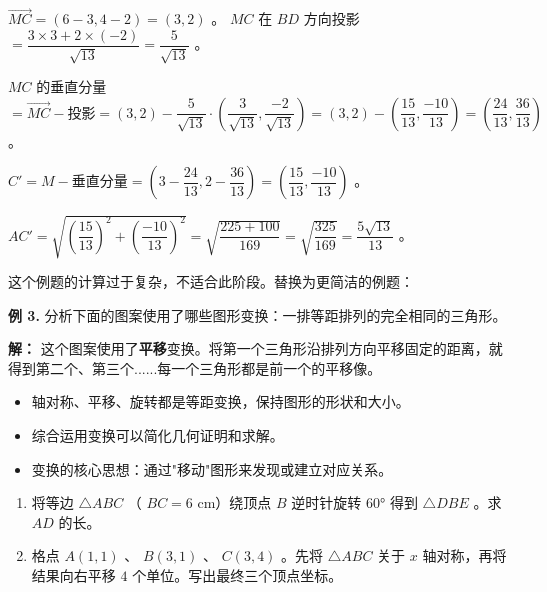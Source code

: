 \begin{workedexamples}
$\vec{MC} = (6-3, 4-2) = (3, 2)$ 。 $MC$ 在 $BD$ 方向投影 $= \dfrac{3 \times 3 + 2 \times (-2)}{\sqrt{13}} = \dfrac{5}{\sqrt{13}}$ 。

$MC$ 的垂直分量 $= \vec{MC} - \text{投影} = (3, 2) - \dfrac{5}{\sqrt{13}} \cdot \left(\dfrac{3}{\sqrt{13}}, \dfrac{-2}{\sqrt{13}}\right) = (3,2) - \left(\dfrac{15}{13}, \dfrac{-10}{13}\right) = \left(\dfrac{24}{13}, \dfrac{36}{13}\right)$ 。

$C' = M - \text{垂直分量} = \left(3 - \dfrac{24}{13}, 2 - \dfrac{36}{13}\right) = \left(\dfrac{15}{13}, \dfrac{-10}{13}\right)$ 。

$AC' = \sqrt{\left(\dfrac{15}{13}\right)^2 + \left(\dfrac{-10}{13}\right)^2} = \sqrt{\dfrac{225 + 100}{169}} = \sqrt{\dfrac{325}{169}} = \dfrac{5\sqrt{13}}{13}$ 。

这个例题的计算过于复杂，不适合此阶段。替换为更简洁的例题：

\textbf{例 3.} 分析下面的图案使用了哪些图形变换：一排等距排列的完全相同的三角形。

\textbf{解：}
这个图案使用了\textbf{平移}变换。将第一个三角形沿排列方向平移固定的距离，就得到第二个、第三个......每一个三角形都是前一个的平移像。

\end{workedexamples}

\begin{keytakeaway}


\begin{itemize}
  \item 轴对称、平移、旋转都是等距变换，保持图形的形状和大小。
  \item 综合运用变换可以简化几何证明和求解。
  \item 变换的核心思想：通过"移动"图形来发现或建立对应关系。
\end{itemize}


\end{keytakeaway}

\begin{practice}


\begin{enumerate}
  \item 将等边 $\triangle ABC$ （ $BC = 6$ cm）绕顶点 $B$ 逆时针旋转 $60°$ 得到 $\triangle DBE$ 。求 $AD$ 的长。
  \item 格点 $A(1, 1)$ 、 $B(3, 1)$ 、 $C(3, 4)$ 。先将 $\triangle ABC$ 关于 $x$ 轴对称，再将结果向右平移 $4$ 个单位。写出最终三个顶点坐标。
\end{enumerate}


\end{practice}



